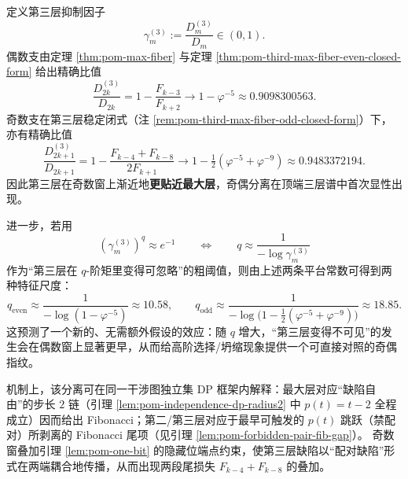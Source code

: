 \begin{remark}\label{rem:pom-third-max-gap-parity}
定义第三层抑制因子
\[
\gamma_m^{(3)}:=\frac{D_m^{(3)}}{D_m}\in(0,1).
\]
偶数支由定理 \ref{thm:pom-max-fiber} 与定理 \ref{thm:pom-third-max-fiber-even-closed-form} 给出精确比值
\[
\frac{D_{2k}^{(3)}}{D_{2k}}
=1-\frac{F_{k-3}}{F_{k+2}}
\longrightarrow
1-\varphi^{-5}
\approx 0.9098300563.
\]
奇数支在第三层稳定闭式（注 \ref{rem:pom-third-max-fiber-odd-closed-form}）下，亦有精确比值
\[
\frac{D_{2k+1}^{(3)}}{D_{2k+1}}
=1-\frac{F_{k-4}+F_{k-8}}{2F_{k+1}}
\longrightarrow
1-\tfrac12(\varphi^{-5}+\varphi^{-9})
\approx 0.9483372194.
\]
因此第三层在奇数窗上渐近地\textbf{更贴近最大层}，奇偶分离在顶端三层谱中首次显性出现。
\par
进一步，若用
\[
\left(\gamma_m^{(3)}\right)^q\approx e^{-1}
\qquad\Longleftrightarrow\qquad
q\approx \frac{1}{-\log \gamma_m^{(3)}}
\]
作为“第三层在 \(q\)-阶矩里变得可忽略”的粗阈值，则由上述两条平台常数可得到两种特征尺度：
\[
q_{\mathrm{even}}\approx \frac{1}{-\log(1-\varphi^{-5})}\approx 10.58,
\qquad
q_{\mathrm{odd}}\approx \frac{1}{-\log\bigl(1-\tfrac12(\varphi^{-5}+\varphi^{-9})\bigr)}\approx 18.85.
\]
这预测了一个新的、无需额外假设的效应：随 \(q\) 增大，“第三层变得不可见”的发生会在偶数窗上显著更早，从而给高阶选择/坍缩现象提供一个可直接对照的奇偶指纹。
\par
机制上，该分离可在同一干涉图独立集 DP 框架内解释：最大层对应“缺陷自由”的步长 \(2\) 链（引理 \ref{lem:pom-independence-dp-radius2} 中 \(p(t)=t-2\) 全程成立）因而给出 Fibonacci；第二/第三层对应于最早可触发的 \(p(t)\) 跳跃（禁配对）所剥离的 Fibonacci 尾项（见引理 \ref{lem:pom-forbidden-pair-fib-gap}）。
奇数窗叠加引理 \ref{lem:pom-one-bit} 的隐藏位端点约束，使第三层缺陷以“配对缺陷”形式在两端耦合地传播，从而出现两段尾损失 \(F_{k-4}+F_{k-8}\) 的叠加。
\end{remark}

